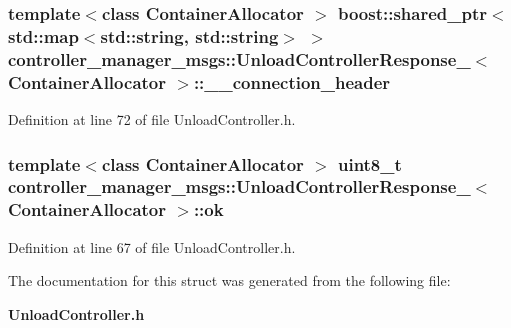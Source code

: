 \subsubsection[{\-\_\-\-\_\-connection\-\_\-header}]{\setlength{\rightskip}{0pt plus 5cm}template$<$class Container\-Allocator $>$ boost\-::shared\-\_\-ptr$<$std\-::map$<$std\-::string, std\-::string$>$ $>$ {\bf controller\-\_\-manager\-\_\-msgs\-::\-Unload\-Controller\-Response\-\_\-}$<$ \-Container\-Allocator $>$\-::{\bf \-\_\-\-\_\-connection\-\_\-header}}\label{structcontroller__manager__msgs_1_1UnloadControllerResponse___a8274127e800041dbbc8fb3c744c531cf}


\-Definition at line 72 of file \-Unload\-Controller.\-h.

\subsubsection[{ok}]{\setlength{\rightskip}{0pt plus 5cm}template$<$class Container\-Allocator $>$ uint8\-\_\-t {\bf controller\-\_\-manager\-\_\-msgs\-::\-Unload\-Controller\-Response\-\_\-}$<$ \-Container\-Allocator $>$\-::{\bf ok}}\label{structcontroller__manager__msgs_1_1UnloadControllerResponse___aa8f4ae015ef36be558b0dd4ae4d14279}


\-Definition at line 67 of file \-Unload\-Controller.\-h.



\-The documentation for this struct was generated from the following file\-:\begin{DoxyCompactItemize}
\item 
{\bf \-Unload\-Controller.\-h}\end{DoxyCompactItemize}
